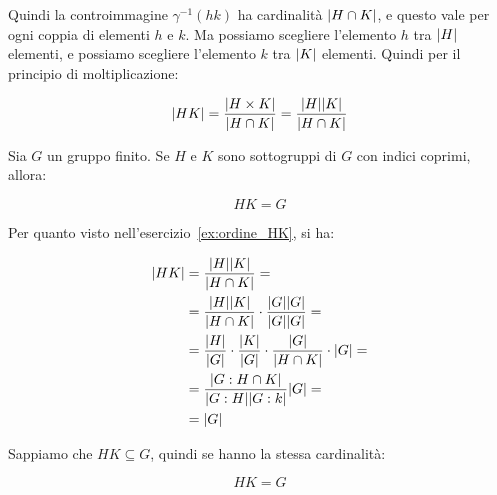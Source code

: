 \begin{soluzione}
	Quindi la controimmagine $\gamma^{-1}(hk)$ ha cardinalità $\lvert H \cap K \rvert$, e questo vale per ogni coppia di elementi $h$ e $k$. Ma possiamo scegliere l'elemento $h$ tra $\lvert H \rvert$ elementi, e possiamo scegliere l'elemento $k$ tra $\lvert K \rvert$ elementi. Quindi per il principio di moltiplicazione:
	
	\begin{equation}
		\lvert HK \rvert = \dfrac{\lvert H \times K \rvert}{\lvert H \cap K \rvert} = \dfrac{\lvert H \rvert\lvert K \rvert}{\lvert H \cap K \rvert}
	\end{equation}

\end{soluzione}

\begin{esercizio}
	\label{ex:indici_coprimi}
	Sia $G$ un gruppo finito.
	Se $H$ e $K$ sono sottogruppi di $G$ con indici coprimi, allora:
	
	\begin{equation}
		HK = G
	\end{equation}
\end{esercizio}
\begin{soluzione}
	Per quanto visto nell'esercizio~\ref{ex:ordine_HK}, si ha:
	
	\begin{align}
		\lvert HK \rvert 
		&= \dfrac{\lvert H \rvert\lvert K \rvert}{\lvert H \cap K \rvert} = \\
		&= \dfrac{\lvert H \rvert\lvert K \rvert}{\lvert H \cap K \rvert} \cdot \dfrac{\lvert G \rvert\lvert G \rvert}{\lvert G \rvert\lvert G \rvert} = \\
		&= \dfrac{\lvert H \rvert}{\lvert G \rvert} \cdot \dfrac{\lvert K \rvert}{\lvert G \rvert}\cdot\dfrac{\lvert G \rvert}{\lvert H \cap K \rvert} \cdot \lvert G \rvert = \\
		&= \dfrac{\lvert G:H \cap K \rvert}{\lvert G:H \rvert\lvert G:k \rvert}\lvert G \rvert = \\
		&= \lvert G \rvert
	\end{align}

	Sappiamo che $HK \subseteq G$, quindi se hanno la stessa cardinalità:
	
	\begin{equation}
		HK = G
	\end{equation}
\end{soluzione}
